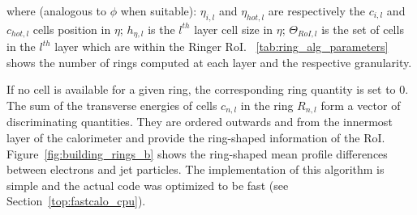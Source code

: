 \noindent where (analogous to $\phi$ when suitable): $\eta_{i,l}$
and $\eta_{hot,l}$ are respectively the $c_{i,l}$ and $c_{hot,l}$
cells position in $\eta$; $h_{\eta,l}$ is the $l^{th}$ layer cell size in $\eta$; $\Theta_{RoI,l}$ is the set of cells
in the $l^{th}$ layer which are within the Ringer RoI.
\tablename~\ref{tab:ring_alg_parameters} shows the number of rings computed at each layer and the respective granularity.





If no cell is available for a given ring, the corresponding ring quantity is set to 0.
The sum of the transverse energies of cells $c_{n,l}$ in the ring $R_{n,l}$ form a vector of discriminating quantities. 
They are ordered outwards and from the
innermost layer of the calorimeter and provide the ring-shaped information 
of the RoI. Figure~\ref{fig:building_rings_b} shows the ring-shaped mean profile differences between electrons and jet particles. The implementation of this algorithm is simple and the actual code
was optimized to be fast (see Section~\ref{top:fastcalo_cpu}). 









%


